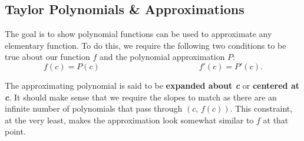 \documentclass[addpoints, 12pt]{exam}
\begin{document}


\newpage
{}
\subsection*{Taylor Polynomials \& Approximations}
The goal is to show polynomial functions can be used to approximate any elementary function. To do this, we require the following two conditions to be true about our function $f$ and the polynomial approximation $P$:
\[f(c)=P(c)\hspace{2in}f'(c)=P'(c).\]

\begin{center}
\end{center}


The approximating polynomial is said to be \textbf{expanded about \textit{c}} or \textbf{centered at \textit{c}}. It should make sense that we require the slopes to match as there are an infinite number of polynomials that pass through $(c,\,f(c))$. This constraint, at the very least, makes the approximation look somewhat similar to $f$ at that point.\\
\\
\end{document}
